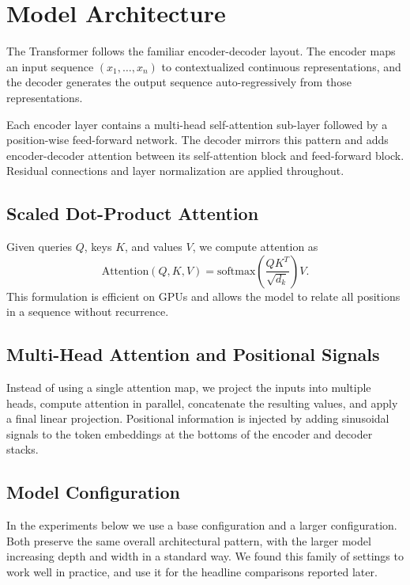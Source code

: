 \section{Model Architecture}

The Transformer follows the familiar encoder-decoder layout. The encoder maps an input sequence $(x_1, \ldots, x_n)$ to contextualized continuous representations, and the decoder generates the output sequence auto-regressively from those representations.

Each encoder layer contains a multi-head self-attention sub-layer followed by a position-wise feed-forward network. The decoder mirrors this pattern and adds encoder-decoder attention between its self-attention block and feed-forward block. Residual connections and layer normalization are applied throughout.

\subsection{Scaled Dot-Product Attention}

Given queries $Q$, keys $K$, and values $V$, we compute attention as
\[
\mathrm{Attention}(Q, K, V) = \mathrm{softmax}\left(\frac{QK^T}{\sqrt{d_k}}\right)V.
\]
This formulation is efficient on GPUs and allows the model to relate all positions in a sequence without recurrence.

\subsection{Multi-Head Attention and Positional Signals}

Instead of using a single attention map, we project the inputs into multiple heads, compute attention in parallel, concatenate the resulting values, and apply a final linear projection. Positional information is injected by adding sinusoidal signals to the token embeddings at the bottoms of the encoder and decoder stacks.

\subsection{Model Configuration}

In the experiments below we use a base configuration and a larger configuration. Both preserve the same overall architectural pattern, with the larger model increasing depth and width in a standard way. We found this family of settings to work well in practice, and use it for the headline comparisons reported later.
